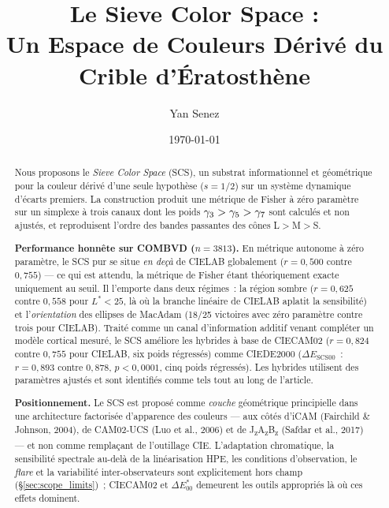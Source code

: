 \documentclass[12pt,a4paper]{article}
\title{Le Sieve Color Space :\\
Un Espace de Couleurs D\'eriv\'e du Crible d'\'Eratosth\`ene}
\author{Yan Senez}
\date{\today}
\begin{document}
\maketitle

\begin{abstract}
Nous proposons le \emph{Sieve Color Space} (SCS), un substrat
informationnel et g\'eom\'etrique pour la couleur d\'eriv\'e d'une
seule hypoth\`ese ($s = 1/2$) sur un syst\`eme dynamique d'\'ecarts
premiers. La construction produit une m\'etrique de Fisher \`a z\'ero
param\`etre sur un simplexe \`a trois canaux dont les poids
$\gamma_{3} > \gamma_{5} > \gamma_{7}$ sont calcul\'es et non ajust\'es, et
reproduisent l'ordre des bandes passantes des c\^ones L$>$M$>$S.

\medskip\noindent\textbf{Performance honn\^ete sur COMBVD
($n = 3813$).} En m\'etrique autonome \`a z\'ero param\`etre, le SCS
pur se situe \emph{en de\c{c}\`a} de CIELAB globalement
($r = 0{,}500$ contre $0{,}755$) --- ce qui est attendu, la m\'etrique
de Fisher \'etant th\'eoriquement exacte uniquement au seuil. Il
l'emporte dans deux r\'egimes~: la r\'egion sombre ($r = 0{,}625$
contre $0{,}558$ pour $L^* < 25$, l\`a o\`u la branche lin\'eaire de
CIELAB aplatit la sensibilit\'e) et l'\emph{orientation} des ellipses
de MacAdam (18/25 victoires avec z\'ero param\`etre contre trois pour
CIELAB). Trait\'e comme un canal d'information additif venant
compl\'eter un mod\`ele cortical mesur\'e, le SCS am\'eliore les
hybrides \`a base de CIECAM02 ($r = 0{,}824$ contre $0{,}755$ pour
CIELAB, six poids r\'egress\'es) comme CIEDE2000
($\Delta E_{\mathrm{SCS00}}$~: $r = 0{,}893$ contre $0{,}878$,
$p < 0{,}0001$, cinq poids r\'egress\'es). Les hybrides utilisent des
param\`etres ajust\'es et sont identifi\'es comme tels tout au long de
l'article.

\medskip\noindent\textbf{Positionnement.} Le SCS est propos\'e comme
\emph{couche} g\'eom\'etrique principielle dans une architecture
factoris\'ee d'apparence des couleurs --- aux c\^ot\'es d'iCAM
(Fairchild \& Johnson, 2004), de CAM02-UCS (Luo et al., 2006) et de
J\textsubscript{z}A\textsubscript{z}B\textsubscript{z}
(Safdar et al., 2017) --- et non comme rempla\c{c}ant de l'outillage
CIE. L'adaptation chromatique, la sensibilit\'e spectrale au-del\`a
de la lin\'earisation HPE, les conditions d'observation, le
\emph{flare} et la variabilit\'e inter-observateurs sont
explicitement hors champ (\S\ref{sec:scope_limits})~; CIECAM02 et
$\Delta E^*_{00}$ demeurent les outils appropri\'es l\`a o\`u ces
effets dominent.


\end{abstract}
\end{document}
